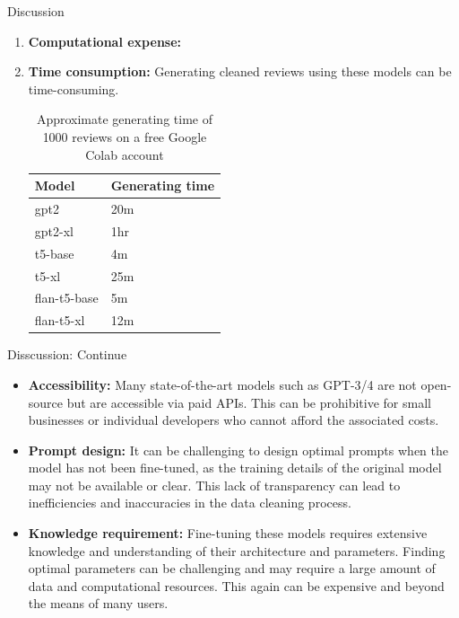 \documentclass{beamer}
\begin{document}
\begin{frame}{Discussion}
    \begin{enumerate}
    \item \textbf{Computational expense:} 


    \item \textbf{Time consumption:} Generating cleaned reviews using these models can be time-consuming.
    \begin{table}[h]
    \centering
    \begin{tabular}{ll}
    \toprule
    \textbf{Model} & \textbf{Generating time} \\
    \midrule
    gpt2 & 20m\\
    gpt2-xl & 1hr\\
    t5-base & 4m\\
    t5-xl & 25m\\
    flan-t5-base & 5m\\
    flan-t5-xl & 12m \\
    \bottomrule
    \end{tabular}
    \caption{Approximate generating time of 1000 reviews on a free Google Colab account}
    \end{table}

\end{enumerate}
\end{frame}

\begin{frame}{Disscussion: Continue}
        
    \begin{itemize}

    
    \item \textbf{Accessibility:} Many state-of-the-art models such as GPT-3/4 are not open-source but are accessible via paid APIs. This can be prohibitive for small businesses or individual developers who cannot afford the associated costs.
    
    \item \textbf{Prompt design:} It can be challenging to design optimal prompts when the model has not been fine-tuned, as the training details of the original model may not be available or clear. This lack of transparency can lead to inefficiencies and inaccuracies in the data cleaning process.
    
    \item \textbf{Knowledge requirement:} Fine-tuning these models requires extensive knowledge and understanding of their architecture and parameters. Finding optimal parameters can be challenging and may require a large amount of data and computational resources. This again can be expensive and beyond the means of many users.


    \end{itemize}
\end{frame}
\end{document}
